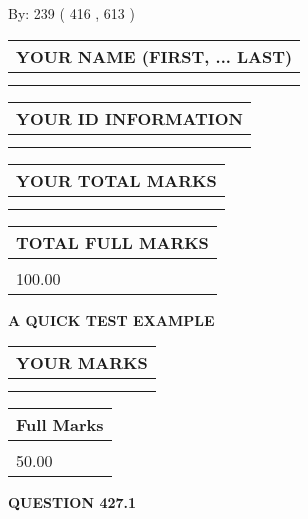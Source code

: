 \documentclass[12pt]{article}
\begin{document}
   
\hspace{1.0in} By: 
 239 ( 416 ,  613 )
   
   
   
   
\newpage 
\setcounter{page}{ 
   427001 } 
   
   
   
   
\noindent\begin{tabular}{|l|}
\hline
YOUR NAME (FIRST, ... LAST)  \\
\hline
 \\ 
 \\ 
\hline
\end{tabular}
\hspace{0.05in} \begin{tabular}{|l|}
\hline
 YOUR   ID   INFORMATION  \\
\hline
 \\ 
 \\ 
\hline
\end{tabular}
   
   
\vspace{0.2in}\noindent\begin{tabular}{|l|}
\hline
YOUR TOTAL MARKS  \\
\hline
 \\ 
 \\ 
\hline
\end{tabular}
\hspace{0.05in} \begin{tabular}{|l|}
\hline
TOTAL FULL MARKS  \\
\hline
 \\ 
100.00 \\
\hline
\end{tabular}
   
   
 \vspace{0.2in}
{\LARGE {\textbf{ A QUICK TEST EXAMPLE}}}
   
   
  
\vspace{0.2in}
  
\noindent\begin{tabular}{|l|}
\hline
 YOUR MARKS  \\
\hline
 \\ 
 \\ 
\hline
\end{tabular}
\hspace{0.05in} \begin{tabular}{|l|}
\hline
 Full Marks  \\
\hline
 \\ 
50.00 \\
\hline
\end{tabular}
{\textbf{\Large{QUESTION
427.1 
}}}
  
\end{document}
